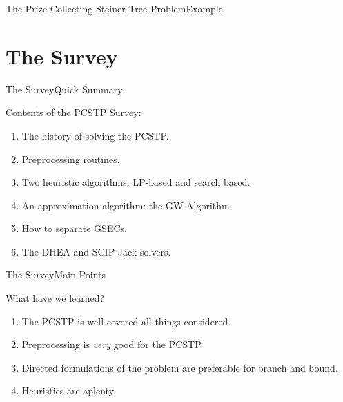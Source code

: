 \documentclass[rgb,dvipsnames]{beamer}
\begin{document}
\begin{frame}{The Prize-Collecting Steiner Tree Problem}{Example}
  \centering

\end{frame}

\section{The Survey}

\begin{frame}{The Survey}{Quick Summary}

  \begin{block}{Contents of the PCSTP Survey:}
  \begin{enumerate}
  \item The history of solving the PCSTP.
  \item Preprocessing routines.
  \item Two heuristic algorithms. LP-based and search based.
  \item An approximation algorithm: the GW Algorithm.
  \item How to separate GSECs.
  \item The DHEA and SCIP-Jack solvers.
  \end{enumerate}
\end{block}
\end{frame}

\begin{frame}{The Survey}{Main Points}
  \begin{block}{What have we learned?}
    \pause
    \begin{enumerate}
    \item The PCSTP is well covered all things considered. \pause
  \item Preprocessing is \textit{very} good for the PCSTP. \pause
  \item Directed formulations of the problem are preferable for
    branch and bound. \pause
  \item Heuristics are aplenty.
  \end{enumerate}
  \end{block}

\end{frame}
\end{document}
